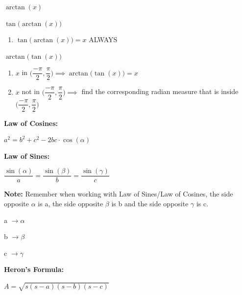 \documentclass[12pt]{article}
\newenvironment{myindentpar}[1]%
     {\begin{list}{}%
             {\setlength{\leftmargin}{#1}}%
             \item[]%
     }
     {\end{list}}
\begin{document}
\begin{myindentpar}{1cm}
\begin{enumerate}
\item $\arctan(x)$
\begin{myindentpar}{1cm}
\begin{enumerate}
\item $\tan\Big(\arctan(x)\Big)$
\begin{myindentpar}{1cm}
\begin{enumerate}
\item $\tan\Big(\arctan(x)\Big) = x$ ALWAYS
\end{enumerate}
\end{myindentpar}
\item $\arctan\Big(\tan(x)\Big)$
\begin{myindentpar}{1cm}
\begin{enumerate}
\item $x$ in $\Big(\dfrac{-\pi}{2}, \dfrac{\pi}{2}\Big) \implies \arctan\Big(\tan(x)\Big) = x$ 
\item  $x$ not in $\Big(\dfrac{-\pi}{2}, \dfrac{\pi}{2}\Big) \implies$ find the corresponding radian measure that is inside $\Big(\dfrac{-\pi}{2}, \dfrac{\pi}{2}\Big)$
\end{enumerate}
\end{myindentpar}
\end{enumerate}
\end{myindentpar}

\end{enumerate}
\end{myindentpar}

\textbf{Law of Cosines:}

\centerline{$a^{2} = b^{2} + c^{2} - 2bc \cdot \cos(\alpha)$}

\textbf{Law of Sines:}

\centerline{$\dfrac{\sin(\alpha)}{a} = \dfrac{\sin(\beta)}{b} = \dfrac{\sin(\gamma)}{c}$}

\begin{myindentpar}{1cm}
\textbf{Note:} Remember when working with Law of Sines/Law of Cosines, the side opposite $\alpha$ is a, the side opposite $\beta$ is b and the side opposite $\gamma$ is c.

a $\rightarrow \alpha$

b $\rightarrow \beta$

c $\rightarrow \gamma$



\end{myindentpar}

\textbf{Heron's Formula:}

\centerline{$A = \sqrt{s(s-a)(s-b)(s-c)}$}
\end{document}
